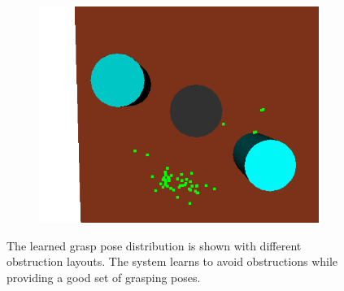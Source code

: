 \begin{figure}
\begin{subfigure}[b]{0.3\linewidth}
    \includegraphics[width=\textwidth]{images/finalgraspobstr2.png}
    \caption{}
  \end{subfigure}
  \caption{The learned grasp pose distribution
is shown with different obstruction layouts. The system learns to
avoid obstructions while providing a good set of grasping poses.}
  \label{fig:obstr}
\end{figure}

\begin{table}
  \centering
  \vspace{8pt}
  \caption{Percent solved and standard deviation, along with time spent motion planning and number of calls to the motion
planner for baseline system (B), our system without heuristics for plan refinement graph search (L),
and our full system (F). Results using our system are averaged across 10 different sets of weights. Time limit: 300s.}
  \label{table:results}
\end{table}

